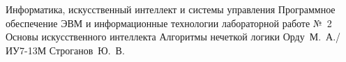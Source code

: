 \documentclass{bmstu}
\begin{document}
\makereporttitle
    {Информатика, искусственный интеллект и системы управления} %
    {Программное обеспечение ЭВМ и информационные технологии} %
    {лабораторной работе №~2} %
    {Основы искусственного интеллекта} %
    {Алгоритмы нечеткой логики} %
    {} %
    {Орду~М.~А./ИУ7-13М} %
    {Строганов~Ю.~В.} %

\maketableofcontents







\end{document}

